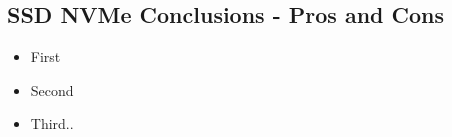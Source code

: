 \vspace*{-\baselineskip}
\subsection{SSD NVMe Conclusions - Pros and Cons}
\begin{itemize}
  \item First
  \item Second
  \item Third..
\end{itemize}
